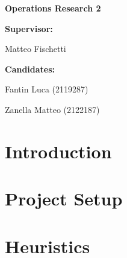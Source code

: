 \documentclass[a4paper,12pt]{report}
\newcommand\blankpage{%
    \null
    \thispagestyle{empty}%
    \addtocounter{page}{-1}%
    \newpage}
\begin{document}
\begin{titlepage}
\begin{center}
\textbf{\large Operations Research 2}\\
\vfill

\raggedright\textbf{\large Supervisor:} \\
\raggedright\large Matteo Fischetti\\
\vfill
\raggedright\textbf{\large Candidates:} \\
\raggedright\large Fantin Luca (2119287)  \\
\raggedright\large Zanella Matteo (2122187)\\

\vfill
{}

\end{center}
\end{titlepage}

    

    

\clearpage{\pagestyle{plain}\cleardoublepage}
\tableofcontents

\clearpage{\pagestyle{plain}\cleardoublepage}


\clearpage{\pagestyle{plain}\cleardoublepage}
\chapter{Introduction}


\clearpage{\pagestyle{plain}\cleardoublepage}
\chapter{Project Setup}


\clearpage{\pagestyle{plain}\cleardoublepage}
\chapter{Heuristics}

\end{document}
